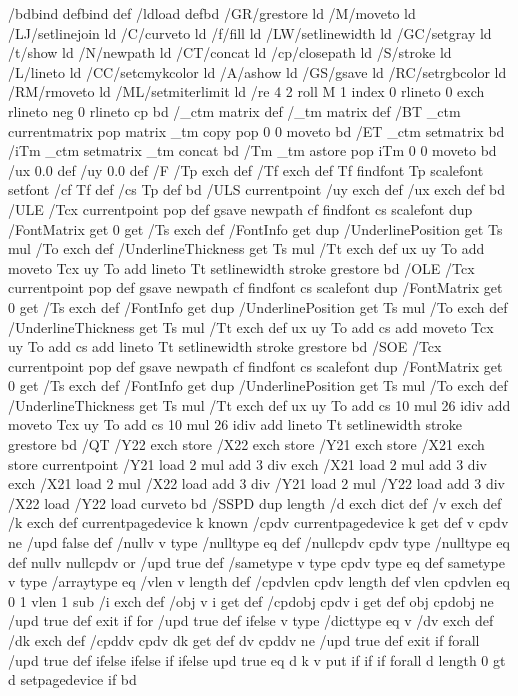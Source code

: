 /bd{bind def}bind def
/ld{load def}bd
/GR/grestore ld
/M/moveto ld
/LJ/setlinejoin ld
/C/curveto ld
/f/fill ld
/LW/setlinewidth ld
/GC/setgray ld
/t/show ld
/N/newpath ld
/CT/concat ld
/cp/closepath ld
/S/stroke ld
/L/lineto ld
/CC/setcmykcolor ld
/A/ashow ld
/GS/gsave ld
/RC/setrgbcolor ld
/RM/rmoveto ld
/ML/setmiterlimit ld
/re {4 2 roll M
1 index 0 rlineto
0 exch rlineto
neg 0 rlineto
cp } bd
/_ctm matrix def
/_tm matrix def
/BT { _ctm currentmatrix pop matrix _tm copy pop 0 0 moveto } bd
/ET { _ctm setmatrix } bd
/iTm { _ctm setmatrix _tm concat } bd
/Tm { _tm astore pop iTm 0 0 moveto } bd
/ux 0.0 def
/uy 0.0 def
/F {
  /Tp exch def
  /Tf exch def
  Tf findfont Tp scalefont setfont
  /cf Tf def  /cs Tp def
} bd
/ULS {currentpoint /uy exch def /ux exch def} bd
/ULE {
  /Tcx currentpoint pop def
  gsave
  newpath
  cf findfont cs scalefont dup
  /FontMatrix get 0 get /Ts exch def /FontInfo get dup
  /UnderlinePosition get Ts mul /To exch def
  /UnderlineThickness get Ts mul /Tt exch def
  ux uy To add moveto  Tcx uy To add lineto
  Tt setlinewidth stroke
  grestore
} bd
/OLE {
  /Tcx currentpoint pop def
  gsave
  newpath
  cf findfont cs scalefont dup
  /FontMatrix get 0 get /Ts exch def /FontInfo get dup
  /UnderlinePosition get Ts mul /To exch def
  /UnderlineThickness get Ts mul /Tt exch def
  ux uy To add cs add moveto Tcx uy To add cs add lineto
  Tt setlinewidth stroke
  grestore
} bd
/SOE {
  /Tcx currentpoint pop def
  gsave
  newpath
  cf findfont cs scalefont dup
  /FontMatrix get 0 get /Ts exch def /FontInfo get dup
  /UnderlinePosition get Ts mul /To exch def
  /UnderlineThickness get Ts mul /Tt exch def
  ux uy To add cs 10 mul 26 idiv add moveto Tcx uy To add cs 10 mul 26 idiv add lineto
  Tt setlinewidth stroke
  grestore
} bd
/QT {
/Y22 exch store
/X22 exch store
/Y21 exch store
/X21 exch store
currentpoint
/Y21 load 2 mul add 3 div exch
/X21 load 2 mul add 3 div exch
/X21 load 2 mul /X22 load add 3 div
/Y21 load 2 mul /Y22 load add 3 div
/X22 load /Y22 load curveto
} bd
/SSPD {
dup length /d exch dict def
{
/v exch def
/k exch def
currentpagedevice k known {
/cpdv currentpagedevice k get def
v cpdv ne {
/upd false def
/nullv v type /nulltype eq def
/nullcpdv cpdv type /nulltype eq def
nullv nullcpdv or
{
/upd true def
} {
/sametype v type cpdv type eq def
sametype {
v type /arraytype eq {
/vlen v length def
/cpdvlen cpdv length def
vlen cpdvlen eq {
0 1 vlen 1 sub {
/i exch def
/obj v i get def
/cpdobj cpdv i get def
obj cpdobj ne {
/upd true def
exit
} if
} for
} {
/upd true def
} ifelse
} {
v type /dicttype eq {
v {
/dv exch def
/dk exch def
/cpddv cpdv dk get def
dv cpddv ne {
/upd true def
exit
} if
} forall
} {
/upd true def
} ifelse
} ifelse
} if
} ifelse
upd true eq {
d k v put
} if
} if
} if
} forall
d length 0 gt {
d setpagedevice
} if
} bd
